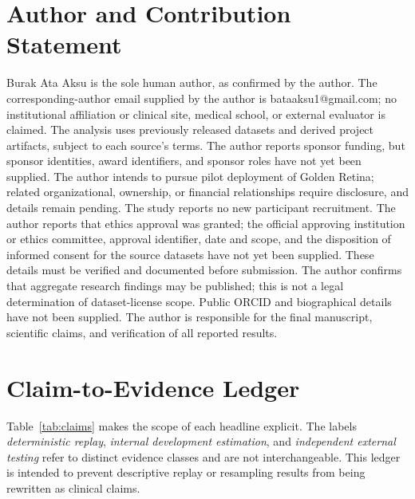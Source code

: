 \documentclass{ieeeaccess}
\begin{document}
\section{Author and Contribution Statement}
Burak Ata Aksu is the sole human author, as confirmed by the author. The corresponding-author email supplied by the author is bataaksu1@gmail.com; no institutional affiliation or clinical site, medical school, or external evaluator is claimed. The analysis uses previously released datasets and derived project artifacts, subject to each source's terms. The author reports sponsor funding, but sponsor identities, award identifiers, and sponsor roles have not yet been supplied. The author intends to pursue pilot deployment of Golden Retina; related organizational, ownership, or financial relationships require disclosure, and details remain pending. The study reports no new participant recruitment. The author reports that ethics approval was granted; the official approving institution or ethics committee, approval identifier, date and scope, and the disposition of informed consent for the source datasets have not yet been supplied. These details must be verified and documented before submission. The author confirms that aggregate research findings may be published; this is not a legal determination of dataset-license scope. Public ORCID and biographical details have not been supplied. The author is responsible for the final manuscript, scientific claims, and verification of all reported results.

\section{Claim-to-Evidence Ledger}
Table~\ref{tab:claims} makes the scope of each headline explicit. The labels \emph{deterministic replay}, \emph{internal development estimation}, and \emph{independent external testing} refer to distinct evidence classes and are not interchangeable. This ledger is intended to prevent descriptive replay or resampling results from being rewritten as clinical claims.
\end{document}
